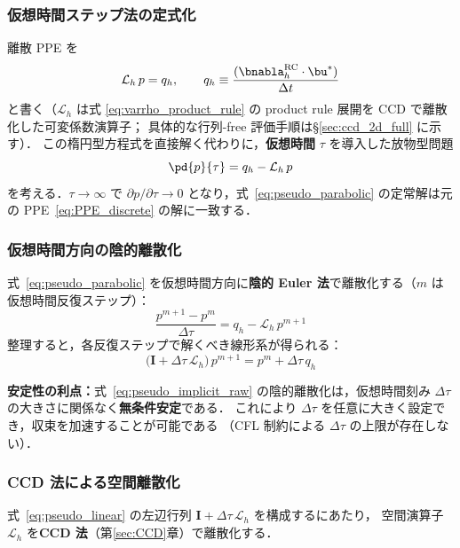 \subsubsection{仮想時間ステップ法の定式化}

離散 PPE を
\begin{equation}
  \mathcal{L}_h\, p = q_h,
  \qquad
  q_h \equiv \frac{(\bnabla_h^{\mathrm{RC}}\cdot\bu^*)}{\Delta t}
  \label{eq:PPE_discrete}
\end{equation}
と書く（$\mathcal{L}_h$ は式 \eqref{eq:varrho_product_rule} の product rule 展開を CCD で離散化した可変係数演算子；
具体的な行列-free 評価手順は§\ref{sec:ccd_2d_full} に示す）．
この楕円型方程式を直接解く代わりに，\textbf{仮想時間} $\tau$ を導入した放物型問題
\begin{equation}
  \pd{p}{\tau} = q_h - \mathcal{L}_h\, p
  \label{eq:pseudo_parabolic}
\end{equation}
を考える．$\tau\to\infty$ で $\partial p/\partial\tau \to 0$ となり，式~\eqref{eq:pseudo_parabolic} の定常解は元の PPE~\eqref{eq:PPE_discrete} の解に一致する．

\subsubsection{仮想時間方向の陰的離散化}

式~\eqref{eq:pseudo_parabolic} を仮想時間方向に\textbf{陰的 Euler 法}で離散化する（$m$ は仮想時間反復ステップ）：
\begin{equation}
  \frac{p^{m+1} - p^m}{\Delta\tau} = q_h - \mathcal{L}_h\, p^{m+1}
  \label{eq:pseudo_implicit_raw}
\end{equation}
整理すると，各反復ステップで解くべき線形系が得られる：
\begin{equation}
  \bigl(\mathbf{I} + \Delta\tau\,\mathcal{L}_h\bigr)\, p^{m+1}
  = p^m + \Delta\tau\, q_h
  \label{eq:pseudo_linear}
\end{equation}

\textbf{安定性の利点：}式~\eqref{eq:pseudo_implicit_raw} の陰的離散化は，仮想時間刻み $\Delta\tau$ の大きさに関係なく\textbf{無条件安定}である．
これにより $\Delta\tau$ を任意に大きく設定でき，収束を加速することが可能である
（CFL 制約による $\Delta\tau$ の上限が存在しない）．

\subsubsection{CCD 法による空間離散化}

式~\eqref{eq:pseudo_linear} の左辺行列 $\mathbf{I} + \Delta\tau\,\mathcal{L}_h$ を構成するにあたり，
空間演算子 $\mathcal{L}_h$ を\textbf{CCD 法}（第\ref{sec:CCD}章）で離散化する．

